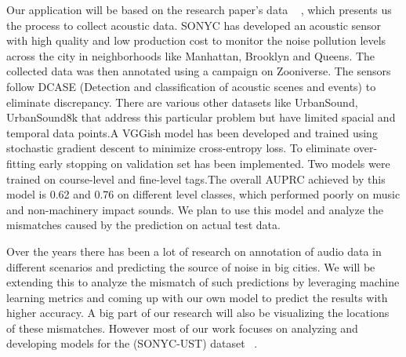 Our application will be based on the research paper's data ~ \cite{4}, which presents us the process to collect acoustic data. SONYC has developed an acoustic sensor with high quality and low production cost to monitor the noise pollution levels across the city in neighborhoods like Manhattan, Brooklyn and Queens. The collected data was then annotated using a campaign on Zooniverse. The sensors follow DCASE (Detection and classification of acoustic scenes and events) to eliminate discrepancy. There are various other datasets like UrbanSound, UrbanSound8k that address this particular problem but have limited spacial and temporal data points.A VGGish model has been developed and trained using stochastic gradient descent to minimize cross-entropy loss. To eliminate over-fitting early stopping on validation set has been implemented. Two models were trained on course-level and fine-level tags.The overall AUPRC achieved by this model is 0.62 and 0.76 on different level classes, which performed poorly on music and non-machinery impact sounds. We plan to use this model and analyze the mismatches caused by the prediction on actual test data. 

Over the years there has been a lot of research on annotation of audio data in different scenarios and predicting the source of noise in big cities. We will be extending this to analyze the mismatch of such predictions by leveraging machine learning metrics and coming up with our own model to predict the results with higher accuracy. A big part of our research will also be visualizing the locations of these mismatches. However most of our work focuses on analyzing and developing models for the (SONYC-UST) dataset ~\cite{7}.



